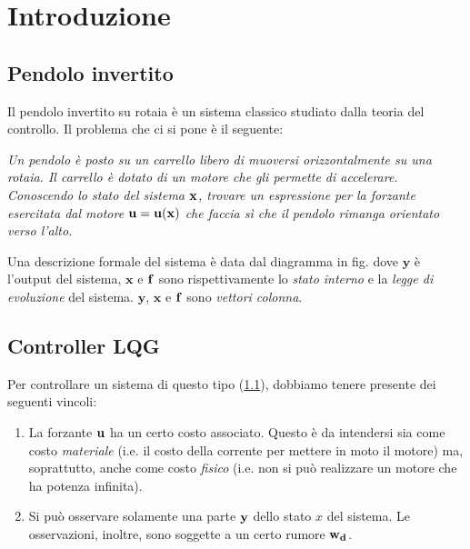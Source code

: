 \section{Introduzione}\label{sec:introduzione}
\subsection{Pendolo invertito}\label{subsec:intro-pendolo}
  Il pendolo invertito su rotaia è un sistema classico studiato dalla teoria del controllo.
  Il problema che ci si pone è il seguente:
  \begin{framed}
  \emph{
      Un pendolo è posto su un carrello libero di muoversi orizzontalmente su una rotaia.
      Il carrello è dotato di un motore che gli permette di accelerare. Conoscendo lo stato del sistema
      $\bf x$, trovare un espressione per la forzante esercitata dal motore $\bf u = \bf u(\bf x)$ che faccia sì
      che il pendolo rimanga orientato verso l'alto.
    }
  \end{framed}

  Una descrizione formale del sistema è data dal diagramma in fig.%
  dove $\mathbf y$ è l'output del sistema, $\mathbf x$ e $\bf f$ sono rispettivamente
  lo \emph{stato interno} e la \emph{legge di evoluzione} del sistema. $\mathbf y$, $\mathbf x$ e $\bf f$ sono
  \emph{vettori colonna}.

\subsection{Controller \textsc{LQG}}\label{subsec:intro-lqg}
Per controllare un sistema di questo tipo (\ref{subsec:intro-pendolo}), dobbiamo tenere presente dei seguenti vincoli:
\begin{enumerate}
  \item%
    La forzante $\bf u$ ha un certo costo associato.
    Questo è da intendersi sia come costo \emph{materiale} (i.e. il costo della corrente per mettere in moto
    il motore) ma, soprattutto, anche come costo \emph{fisico} (i.e. non si può realizzare un motore che ha potenza
    infinita).
  \item%
    Si può osservare solamente una parte $\bf y$ dello stato $x$ del sistema.
    Le osservazioni, inoltre, sono soggette a un certo rumore $\bf w_d$.
\end{enumerate}

